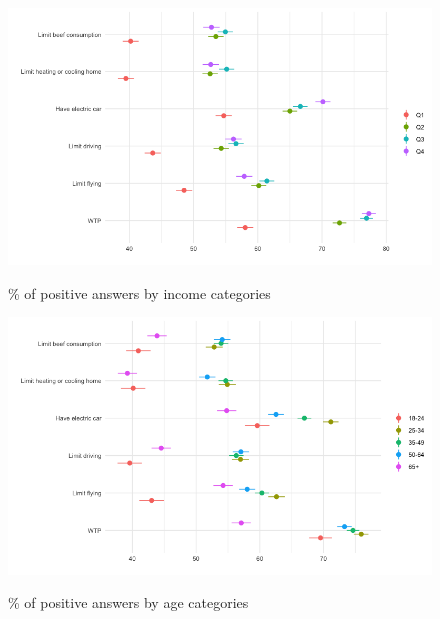\begin{frame}{}%
\begin{figure}[h!]
\caption{\% of positive answers by income categories} %
\includegraphics[width=.7\paperwidth]{../figures/country_comparison/willingness_by_country_income_all.png} \\
\end{figure}
\end{frame}

\begin{frame}{}%
\begin{figure}[h!]
\caption{\% of positive answers by age categories} %
\includegraphics[width=.7\paperwidth]{../figures/country_comparison/willingness_by_country_age_all.png} \\
\end{figure}
\end{frame}

